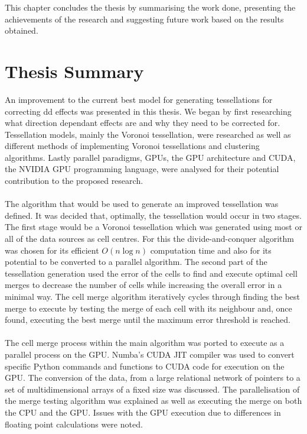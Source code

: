 This chapter concludes the thesis by summarising the work done, presenting the achievements of the research and suggesting future work based on the results obtained.
\section{Thesis Summary}
An improvement to the current best model for generating tessellations for correcting \gls{dd} effects was presented in this thesis. We began by first researching what direction dependant effects are and why they need to be corrected for. Tessellation models, mainly the Voronoi tessellation, were researched as well as different methods of implementing Voronoi tessellations and clustering algorithms. Lastly parallel paradigms, GPUs, the GPU architecture and CUDA, the NVIDIA GPU programming language, were analysed for their potential contribution to the proposed research.
\\
\\
The algorithm that would be used to generate an improved tessellation was defined. It was decided that, optimally, the tessellation would occur in two stages. The first stage would be a Voronoi tessellation which was generated using most or all of the data sources as cell centres. For this the divide-and-conquer algorithm was chosen for its efficient $O(n\log n)$ computation time and also for its potential to be converted to a parallel algorithm. The second part of the tessellation generation used the error of the cells to find and execute optimal cell merges to decrease the number of cells while increasing the overall error in a minimal way. The cell merge algorithm iteratively cycles through finding the best merge to execute by testing the merge of each cell with its neighbour and, once found, executing the best merge until the maximum error threshold is reached.
\\
\\
The cell merge process within the main algorithm was ported to execute as a parallel process on the GPU. Numba's CUDA JIT compiler was used to convert specific Python commands and functions to CUDA code for execution on the GPU. The conversion of the data, from a large relational network of pointers to a set of multidimensional arrays of a fixed size was discussed. The parallelisation of the merge testing algorithm was explained as well as executing the merge on both the CPU and the GPU. Issues with the GPU execution due to differences in floating point calculations were noted.
\\
